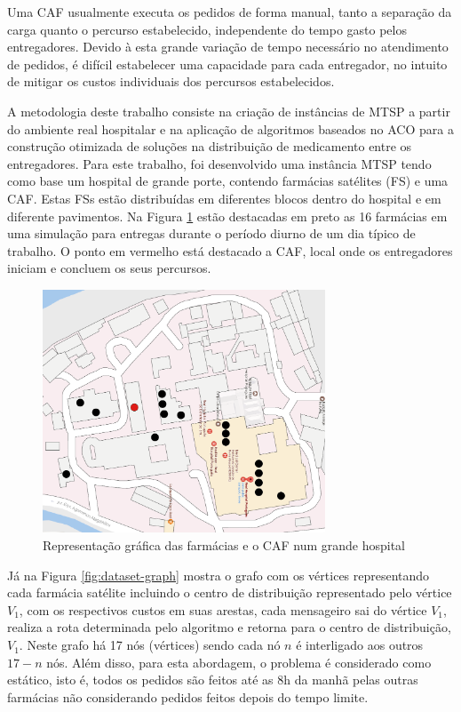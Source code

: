Uma CAF usualmente executa os pedidos de forma manual, tanto a separação da carga quanto o percurso estabelecido, independente do tempo gasto pelos entregadores. Devido à esta grande variação de tempo necessário no atendimento de pedidos, é difícil estabelecer uma capacidade para cada entregador, no intuito de mitigar os custos individuais dos percursos estabelecidos.

A metodologia deste trabalho consiste na criação de instâncias de MTSP a partir do ambiente real hospitalar e na aplicação de algoritmos baseados no ACO para a construção otimizada de soluções na distribuição de medicamento entre os entregadores.
Para este trabalho, foi desenvolvido uma instância MTSP tendo como base um hospital de grande porte, contendo farmácias satélites (FS) e uma CAF. Estas FSs estão distribuídas em diferentes blocos dentro do hospital e em diferente pavimentos. Na Figura \ref{fig:dataset-map} estão destacadas em preto as 16 farmácias em uma simulação para entregas durante o período diurno de um dia típico de trabalho. O ponto em vermelho está destacado a CAF, local onde os entregadores iniciam e concluem os seus percursos.

\begin{figure}[htb]
    \centering
    \caption{\label{fig:dataset-map}Representação gráfica das farmácias e o CAF num grande hospital} 
    \includegraphics[width=0.75\textwidth]{imagens/dataset-map.png}
\end{figure}

Já na Figura \ref{fig:dataset-graph} mostra o grafo com os vértices representando cada farmácia satélite incluindo o centro de distribuição representado pelo vértice $V_1$, com os respectivos custos em suas arestas, cada mensageiro sai do vértice $V_1$, realiza a rota determinada pelo algoritmo e retorna para o centro de distribuição, $V_1$. Neste grafo há 17 nós (vértices) sendo cada nó $n$ é interligado aos outros $17 - n$ nós. Além disso, para esta abordagem, o problema é considerado como estático, isto é, todos os pedidos são feitos até as 8h da manhã pelas outras farmácias não considerando pedidos feitos depois do tempo limite.

